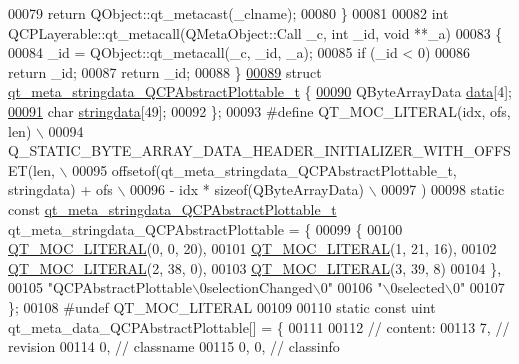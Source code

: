 \begin{DoxyCode}
00079     \textcolor{keywordflow}{return} QObject::qt\_metacast(\_clname);
00080 \}
00081 
00082 \textcolor{keywordtype}{int} QCPLayerable::qt\_metacall(QMetaObject::Call \_c, \textcolor{keywordtype}{int} \_id, \textcolor{keywordtype}{void} **\_a)
00083 \{
00084     \_id = QObject::qt\_metacall(\_c, \_id, \_a);
00085     \textcolor{keywordflow}{if} (\_id < 0)
00086         \textcolor{keywordflow}{return} \_id;
00087     \textcolor{keywordflow}{return} \_id;
00088 \}
\hypertarget{a00067_source_l00089}{}\hyperlink{a00067}{00089} \textcolor{keyword}{struct }\hyperlink{a00067_dd/da2/a00192}{qt\_meta\_stringdata\_QCPAbstractPlottable\_t} \{
\hypertarget{a00067_source_l00090}{}\hyperlink{a00067_ac951832cc81d6220c552b96fc4354c89}{00090}     QByteArrayData \hyperlink{a00067_ac951832cc81d6220c552b96fc4354c89}{data}[4];
\hypertarget{a00067_source_l00091}{}\hyperlink{a00067_ab78c50bc348c723bab72ef878f28856c}{00091}     \textcolor{keywordtype}{char} \hyperlink{a00067_ab78c50bc348c723bab72ef878f28856c}{stringdata}[49];
00092 \};
00093 \textcolor{preprocessor}{#define QT\_MOC\_LITERAL(idx, ofs, len) \(\backslash\)}
00094 \textcolor{preprocessor}{    Q\_STATIC\_BYTE\_ARRAY\_DATA\_HEADER\_INITIALIZER\_WITH\_OFFSET(len, \(\backslash\)}
00095 \textcolor{preprocessor}{    offsetof(qt\_meta\_stringdata\_QCPAbstractPlottable\_t, stringdata) + ofs \(\backslash\)}
00096 \textcolor{preprocessor}{        - idx * sizeof(QByteArrayData) \(\backslash\)}
00097 \textcolor{preprocessor}{    )}
00098 \textcolor{keyword}{static} \textcolor{keyword}{const} \hyperlink{a00067_dd/da2/a00192}{qt\_meta\_stringdata\_QCPAbstractPlottable\_t} 
      qt\_meta\_stringdata\_QCPAbstractPlottable = \{
00099     \{
00100 \hyperlink{a00067_a75bb9482d242cde0a06c9dbdc6b83abe}{QT\_MOC\_LITERAL}(0, 0, 20),
00101 \hyperlink{a00067_a75bb9482d242cde0a06c9dbdc6b83abe}{QT\_MOC\_LITERAL}(1, 21, 16),
00102 \hyperlink{a00067_a75bb9482d242cde0a06c9dbdc6b83abe}{QT\_MOC\_LITERAL}(2, 38, 0),
00103 \hyperlink{a00067_a75bb9482d242cde0a06c9dbdc6b83abe}{QT\_MOC\_LITERAL}(3, 39, 8)
00104     \},
00105     \textcolor{stringliteral}{"QCPAbstractPlottable\(\backslash\)0selectionChanged\(\backslash\)0"}
00106     \textcolor{stringliteral}{"\(\backslash\)0selected\(\backslash\)0"}
00107 \};
00108 \textcolor{preprocessor}{#undef QT\_MOC\_LITERAL}
00109 
00110 \textcolor{keyword}{static} \textcolor{keyword}{const} uint qt\_meta\_data\_QCPAbstractPlottable[] = \{
00111 
00112  \textcolor{comment}{// content:}
00113        7,       \textcolor{comment}{// revision}
00114        0,       \textcolor{comment}{// classname}
00115        0,    0, \textcolor{comment}{// classinfo}

\end{DoxyCode}
